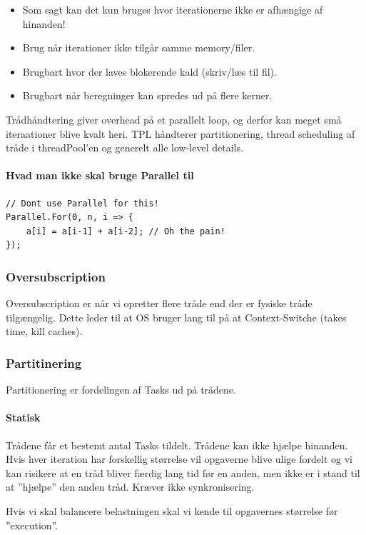 \begin{itemize}
	\item Som sagt kan det kun bruges hvor iterationerne ikke er afhængige af hinanden!
	\item Brug når iterationer ikke tilgår samme memory/filer.
	\item Brugbart hvor der laves blokerende kald (skriv/læs til fil).
	\item Brugbart når beregninger kan spredes ud på flere kerner.
\end{itemize}

Trådhåndtering giver overhead på et parallelt loop, og derfor kan meget små iteraationer blive kvalt heri. TPL håndterer partitionering, thread scheduling af tråde i threadPool'en og generelt alle low-level details.

\paragraph{Hvad man ikke skal bruge Parallel til}
\begin{lstlisting}[caption=Hvad Parallel.For ikke kan bruges til.,
morekeywords={Parallel}]
// Dont use Parallel for this!
Parallel.For(0, n, i => {
	a[i] = a[i-1] + a[i-2];	// Oh the pain!
});
\end{lstlisting}
\subsubsection{Oversubscription}
Oversubscription er når vi opretter flere tråde end der er fysiske tråde tilgængelig. Dette leder til at OS bruger lang til på at Context-Switche (takes time, kill caches).

\subsubsection{Partitinering}
Partitionering er fordelingen af Tasks ud på trådene. 

\paragraph{Statisk}
Trådene får et bestemt antal Tasks tildelt. Trådene kan ikke hjælpe hinanden. Hvis hver iteration har forskellig størrelse vil opgaverne blive ulige fordelt og vi kan risikere at en tråd bliver færdig lang tid før en anden, men ikke er i stand til at ''hjælpe'' den anden tråd. Kræver ikke synkronisering.

Hvis vi skal balancere belastningen skal vi kende til opgavernes størrelse før ''execution''.

